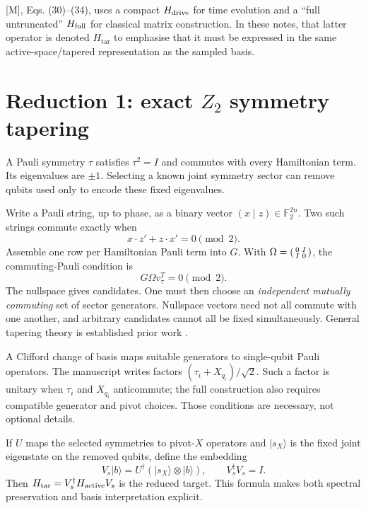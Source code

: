 \documentclass[11pt,a4paper,oneside]{report}
\newcommand{\ket}[1]{\lvert #1\rangle}
\newcommand{\Ht}{H_{\mathrm{tar}}}
\newcommand{\I}{\mathrm i}
\begin{document}
\begin{sourcebox}
{[M]}, Eqs. (30)--(34), uses a compact $H_{\rm drive}$ for time evolution and a ``full untruncated'' $H_{\rm full}$ for classical matrix construction. In these notes, that latter operator is denoted $\Ht$ to emphasise that it must be expressed in the same active-space/tapered representation as the sampled basis.
\end{sourcebox}

\section{Reduction 1: exact $Z_2$ symmetry tapering}
A Pauli symmetry $\tau$ satisfies $\tau^2=I$ and commutes with every Hamiltonian term. Its eigenvalues are $\pm1$. Selecting a known joint symmetry sector can remove qubits used only to encode these fixed eigenvalues.

Write a Pauli string, up to phase, as a binary vector $(x\mid z)\in\mathbb F_2^{2n}$. Two such strings commute exactly when
\begin{equation}
x\cdot z'+z\cdot x'=0\pmod2.
\end{equation}
Assemble one row per Hamiltonian Pauli term into $G$. With $\Omega=\begin{psmallmatrix}0&I\\I&0\end{psmallmatrix}$, the commuting-Pauli condition is
\begin{equation}
G\Omega v_\tau^T=0\pmod2.
\end{equation}
The nullspace gives candidates. One must then choose an \emph{independent mutually commuting} set of sector generators. Nullspace vectors need not all commute with one another, and arbitrary candidates cannot all be fixed simultaneously. General tapering theory is established prior work \cite{bravyi}.

A Clifford change of basis maps suitable generators to single-qubit Pauli operators. The manuscript writes factors $(\tau_i+X_{q_i})/\sqrt2$. Such a factor is unitary when $\tau_i$ and $X_{q_i}$ anticommute; the full construction also requires compatible generator and pivot choices. Those conditions are necessary, not optional details.

If $U$ maps the selected symmetries to pivot-$X$ operators and $\ket{s_X}$ is the fixed joint eigenstate on the removed qubits, define the embedding
\begin{equation}\label{eq:isometry}
V_s\ket b=U^\dagger(\ket{s_X}\otimes\ket b),\qquad V_s^\dagger V_s=I.
\end{equation}
Then $\Ht=V_s^\dagger H_{\rm active}V_s$ is the reduced target. This formula makes both spectral preservation and basis interpretation explicit.
\end{document}
